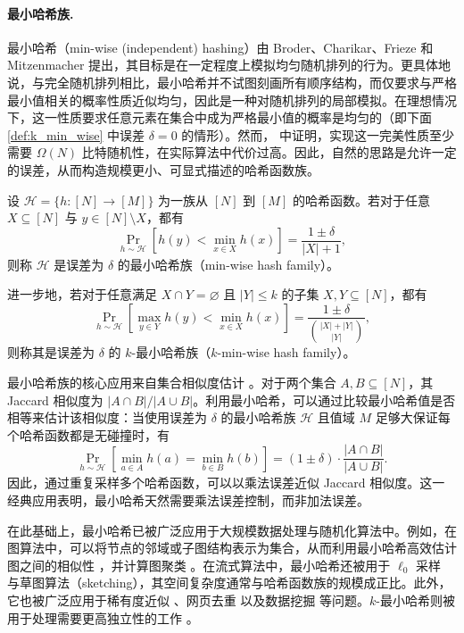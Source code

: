 \paragraph{最小哈希族.}

最小哈希（min-wise (independent) hashing）由 Broder、Charikar、Frieze 和 Mitzenmacher \cite{BCFM98} 提出，其目标是在一定程度上模拟均匀随机排列的行为。更具体地说，与完全随机排列相比，最小哈希并不试图刻画所有顺序结构，而仅要求与严格最小值相关的概率性质近似均匀，因此是一种对随机排列的局部模拟。在理想情况下，这一性质要求任意元素在集合中成为严格最小值的概率是均匀的（即下面 \cref{def:k_min_wise} 中误差 $\delta = 0$ 的情形）。然而，\cite{BCFM98} 中证明，实现这一完美性质至少需要 $\Omega(N)$ 比特随机性，在实际算法中代价过高。因此，自然的思路是允许一定的误差，从而构造规模更小、可显式描述的哈希函数族。

\begin{definition}\label{def:k_min_wise}
    设 $\mathcal{H} = \{h : [N] \to [M]\}$ 为一族从 $[N]$ 到 $[M]$ 的哈希函数。若对于任意 $X \subseteq [N]$ 与 $y \in [N] \setminus X$，都有
    $$
    \Pr_{h \sim \mathcal{H}}\left[ h(y) < \min_{x \in X} h(x) \right]
    = \frac{1 \pm \delta}{|X| + 1},
    $$
    则称 $\mathcal{H}$ 是误差为 $\delta$ 的最小哈希族（min-wise hash family）。
    
    进一步地，若对于任意满足 $X \cap Y = \varnothing$ 且 $|Y| \le k$ 的子集 $X, Y \subseteq [N]$，都有
    $$
    \Pr_{h \sim \mathcal{H}}\left[ \max_{y \in Y} h(y) < \min_{x \in X} h(x) \right]
    = \frac{1 \pm \delta}{\binom{|X| + |Y|}{|Y|}},
    $$
    则称其是误差为 $\delta$ 的 $k$-最小哈希族（$k$-min-wise hash family）。
\end{definition}

最小哈希族的核心应用来自集合相似度估计 \cite{BCFM98, CDF+01}。对于两个集合 $A, B \subseteq [N]$，其 Jaccard 相似度为 $|A \cap B| / |A \cup B|$。利用最小哈希，可以通过比较最小哈希值是否相等来估计该相似度：当使用误差为 $\delta$ 的最小哈希族 $\mathcal{H}$ 且值域 $M$ 足够大保证每个哈希函数都是无碰撞时，有
$$
\Pr_{h \sim \mathcal{H}}\left[\min_{a \in A} h(a) = \min_{b \in B} h(b)\right]
= (1 \pm \delta)\cdot \frac{|A \cap B|}{|A \cup B|}.
$$
因此，通过重复采样多个哈希函数，可以以乘法误差近似 Jaccard 相似度。这一经典应用表明，最小哈希天然需要乘法误差控制，而非加法误差。

在此基础上，最小哈希已被广泛应用于大规模数据处理与随机化算法中。例如，在图算法中，可以将节点的邻域或子图结构表示为集合，从而利用最小哈希高效估计图之间的相似性 \cite{MinHash_Graph_Similarity}，并计算图聚类 \cite{MinHash_Clustering}。在流式算法中，最小哈希还被用于 $\ell_0$ 采样 \cite{CF14,McG14} 与草图算法（sketching）\cite{Cohen2016}，其空间复杂度通常与哈希函数族的规模成正比。此外，它也被广泛应用于稀有度近似 \cite{DM02}、网页去重 \cite{Hen06} 以及数据挖掘 \cite{HGKI02, Hen06} 等问题。$k$-最小哈希则被用于处理需要更高独立性的工作 \cite{KNP+17}。

